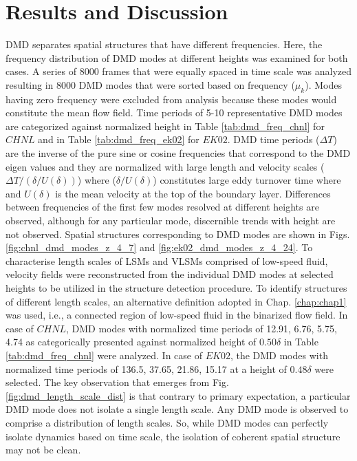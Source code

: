 \section{Results and Discussion}
DMD separates spatial structures that have different frequencies. Here, the frequency distribution of DMD modes at different heights was examined for both cases. A series of 8000 frames that were equally spaced in time scale was analyzed resulting in 8000 DMD modes that were sorted based on frequency ($\mu_k$). Modes having zero frequency were excluded from analysis because these modes would constitute the mean flow field. Time periods of 5-10 representative DMD modes are categorized against normalized height in Table \ref{tab:dmd_freq_chnl} for $CHNL$ and in Table \ref{tab:dmd_freq_ek02} for $EK02$. DMD time periods ($\Delta T$) are the inverse of the pure sine or cosine frequencies that correspond to the DMD eigen values and they are normalized with large length and velocity scales ($\Delta T / (\delta/U(\delta))$) where ($\delta/U(\delta)$) constitutes large eddy turnover time where and $U(\delta)$ is the mean velocity at the top of the boundary layer. Differences between frequencies of the first few modes resolved at different heights are observed, although for any particular mode,  discernible trends with height are not observed. Spatial structures corresponding to DMD modes are shown in Figs. \ref{fig:chnl_dmd_modes_z_4_7} and \ref{fig:ek02_dmd_modes_z_4_24}. To characterise length scales of LSMs and VLSMs comprised of low-speed fluid, velocity fields were reconstructed from the individual DMD modes at selected heights to be utilized in the structure detection procedure. To identify structures of different length scales, an alternative definition adopted in Chap. \ref{chap:chap1} was used, i.e., a connected region of low-speed fluid in the binarized flow field. In case of $CHNL$, DMD modes with normalized time periods of 12.91, 6.76, 5.75, 4.74 as categorically presented against normalized height of $0.50\delta$ in Table \ref{tab:dmd_freq_chnl} were analyzed.  In case of $EK02$, the DMD modes with normalized time periods of 136.5, 37.65, 21.86, 15.17 at a height of $0.48\delta$ were selected. The key observation that emerges from Fig. \ref{fig:dmd_length_scale_dist} is that contrary to primary expectation, a particular DMD mode does not isolate a single length scale. Any DMD mode is observed to comprise a distribution of length scales. So, while DMD modes can perfectly isolate dynamics based on time scale, the isolation of coherent spatial structure may not be clean. 

